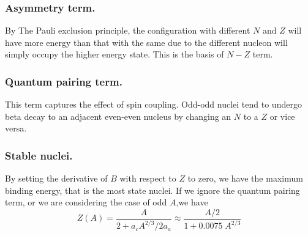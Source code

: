 \documentclass[../../../main.tex]{subfiles}
\begin{document}
\subsubsection{Asymmetry term.} By The Pauli exclusion principle, the configuration with different $N$ and $Z$ will have more energy than that with the same due to the different nucleon will simply occupy the higher energy state. This is the basis of $N-Z$ term.

\subsubsection{Quantum pairing term.} This term captures the effect of spin coupling. Odd-odd nuclei tend to undergo beta decay to an adjacent even-even nucleus by changing an $N$ to a $Z$ or vice versa.

\subsubsection{Stable nuclei.} By setting the derivative of $B$ with respect to $Z$ to zero, we have the maximum binding energy, that is the most state nuclei. If we ignore the quantum pairing term, or we are considering the case of odd $A$,we have 
\begin{equation*}
    Z(A)=\frac{A}{2+a_cA^{2/3}/2a_a}\approx\frac{A/2}{1+0.0075\;A^{2/3}}
\end{equation*} 
\end{document}
